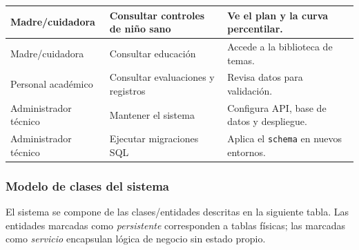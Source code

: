 \documentclass[12pt,letterpaper]{article}
\begin{document}
\begin{longtable}{p{}p{}p{}}
Madre/cuidadora & Consultar controles de niño sano & Ve el plan y la curva percentilar.\\\hline
Madre/cuidadora & Consultar educación & Accede a la biblioteca de temas.\\\hline
Personal académico & Consultar evaluaciones y registros & Revisa datos para validación.\\\hline
Administrador técnico & Mantener el sistema & Configura API, base de datos y despliegue.\\\hline
Administrador técnico & Ejecutar migraciones SQL & Aplica el \texttt{schema} en nuevos entornos.\\\bottomrule
\end{longtable}

\subsubsection{Modelo de clases del sistema}

El sistema se compone de las clases/entidades descritas en la siguiente tabla. Las entidades marcadas como \textit{persistente} corresponden a tablas físicas; las marcadas como \textit{servicio} encapsulan lógica de negocio sin estado propio.
\end{document}
